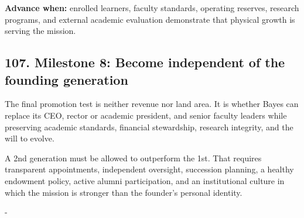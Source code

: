 \textbf{Advance when:} enrolled learners, faculty standards, operating reserves, research programs, and external academic evaluation demonstrate that physical growth is serving the mission.

\subsection{107. Milestone 8: Become independent of the founding generation}

The final promotion test is neither revenue nor land area. It is whether Bayes can replace its CEO, rector or academic president, and senior faculty leaders while preserving academic standards, financial stewardship, research integrity, and the will to evolve.

A 2nd generation must be allowed to outperform the 1st. That requires transparent appointments, independent oversight, succession planning, a healthy endowment policy, active alumni participation, and an institutional culture in which the mission is stronger than the founder's personal identity.

-


